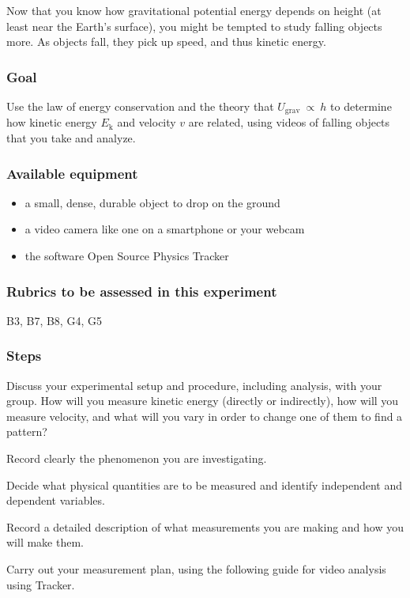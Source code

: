 Now that you know how gravitational potential energy depends on height (at least near the Earth's surface), you might be tempted to study falling objects more. As objects fall, they pick up speed, and thus kinetic energy.

\subsubsection{Goal}

Use the law of energy conservation and the theory that $U_\mathrm{grav}\: \propto\: h$ to determine how kinetic energy $E_\mathrm{k}$ and velocity $v$ are related, using videos of falling objects that you take and analyze.

\subsubsection{Available equipment}

\begin{itemize}
	\item a small, dense, durable object to drop on the ground
	
	\item a video camera like one on a smartphone or your webcam
	
	\item the software Open Source Physics Tracker
\end{itemize}

\subsubsection{Rubrics to be assessed in this experiment}

B3, B7, B8, G4, G5

\subsubsection{Steps}

\begin{steps}
	\item Discuss your experimental setup and procedure, including analysis, with your group. How will you measure kinetic energy (directly or indirectly), how will you measure velocity, and what will you vary in order to change one of them to find a pattern?
	
	\item Record clearly the phenomenon you are investigating.
	
	\item Decide what physical quantities are to be measured and identify independent and dependent variables.
	
	\item Record a detailed description of what measurements you are making and how you will make them.
	
	\item Carry out your measurement plan, using the following guide for video analysis using Tracker.
\end{steps}

